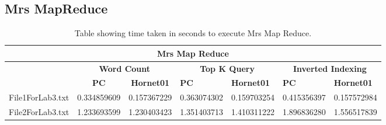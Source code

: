 \documentclass[10pt, twocolumn]{article}
\begin{document}
\subsection{Mrs MapReduce}
\label{app:MrsResults}
%
\begin{table}[H]
\centering
\caption{Table showing time taken in seconds to execute Mrs Map Reduce.}
\label{tbl:MrsMapReduceResults}
\begin{tabular}{|l|l|l|l|l|l|l|}
\hline
\multicolumn{7}{|c|}{\textbf{Mrs Map Reduce}}                                                                                                                                                               \\ \hline
\multicolumn{1}{|c|}{\textbf{}}   & \multicolumn{2}{c|}{\textbf{Word Count}}                                  & \multicolumn{2}{c|}{\textbf{Top K Query}} & \multicolumn{2}{c|}{\textbf{Inverted Indexing}} \\ \hline
 & \multicolumn{1}{c|}{\textbf{PC}} & \multicolumn{1}{c|}{\textbf{Hornet01}} & \textbf{PC}      & \textbf{Hornet01}      & \textbf{PC}         & \textbf{Hornet01}         \\ \cline{1-7} 
File1ForLab3.txt                                  & 0.334859609                      & 0.157367229                            & 0.363074302      & 0.159703254            & 0.415356397         & 0.157572984               \\ \hline
File2ForLab3.txt                  & 1.233693599                      & 1.230403423                            & 1.351403713      & 1.410311222            & 1.896836280         & 1.556517839               \\ \hline
\end{tabular}
\end{table} 
\end{document}
